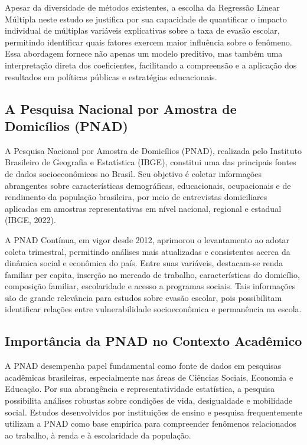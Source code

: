 \documentclass[english, spanish, brazilian]{RBIEarticle} %
\begin{document}
Apesar da diversidade de métodos existentes, a escolha da Regressão Linear Múltipla neste estudo se justifica por sua capacidade de quantificar o impacto individual de múltiplas variáveis explicativas sobre a taxa de evasão escolar, permitindo identificar quais fatores exercem maior influência sobre o fenômeno. Essa abordagem fornece não apenas um modelo preditivo, mas também uma interpretação direta dos coeficientes, facilitando a compreensão e a aplicação dos resultados em políticas públicas e estratégias educacionais.

\subsection{A Pesquisa Nacional por Amostra de Domicílios (PNAD)}
A Pesquisa Nacional por Amostra de Domicílios (PNAD), realizada pelo Instituto Brasileiro de Geografia e Estatística (IBGE), constitui uma das principais fontes de dados socioeconômicos no Brasil. Seu objetivo é coletar informações abrangentes sobre características demográficas, educacionais, ocupacionais e de rendimento da população brasileira, por meio de entrevistas domiciliares aplicadas em amostras representativas em nível nacional, regional e estadual (IBGE, 2022).

A PNAD Contínua, em vigor desde 2012, aprimorou o levantamento ao adotar coleta trimestral, permitindo análises mais atualizadas e consistentes acerca da dinâmica social e econômica do país. Entre suas variáveis, destacam-se renda familiar per capita, inserção no mercado de trabalho, características do domicílio, composição familiar, escolaridade e acesso a programas sociais. Tais informações são de grande relevância para estudos sobre evasão escolar, pois possibilitam identificar relações entre vulnerabilidade socioeconômica e permanência na escola.

\subsection{Importância da PNAD no Contexto Acadêmico}
A PNAD desempenha papel fundamental como fonte de dados em pesquisas acadêmicas brasileiras, especialmente nas áreas de Ciências Sociais, Economia e Educação. Por sua abrangência e representatividade estatística, a pesquisa possibilita análises robustas sobre condições de vida, desigualdade e mobilidade social. Estudos desenvolvidos por instituições de ensino e pesquisa frequentemente utilizam a PNAD como base empírica para compreender fenômenos relacionados ao trabalho, à renda e à escolaridade da população.
\end{document}
